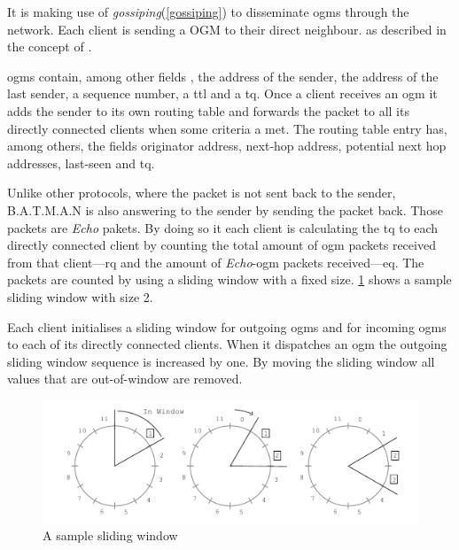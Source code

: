 It is making use of \textit{gossiping}(\ref{gossiping}) to disseminate \glspl{ogm} through the network. Each client is sending a \gls{OGM} to their direct neighbour.  as described in the concept of \citet{batman}.

\Glspl{ogm} contain, among other fields \cite[\S2]{tobias_hardes}, the address of the sender, the address of the last sender, a sequence number, a \gls{ttl} and a \gls{tq}. 
Once a client receives an \gls{ogm} it adds the sender to its own routing table and forwards the packet to all its directly connected clients when some criteria a met. 
The routing table entry has, among others\cite[\S2.1]{tobias_hardes}, the fields originator address, next-hop address, potential next hop addresses, last-seen and \gls{tq}.

Unlike other protocols, where the packet is not sent back to the sender, B.A.T.M.A.N is also answering to the sender by sending the packet back. Those packets are \textit{Echo} pakets. By doing so it each client is calculating the \gls{tq} to each directly connected client by counting the total amount of \gls{ogm} packets received from that client—\gls{rq} and the amount of \textit{Echo}-\gls{ogm} packets received—\gls{eq}. 
The packets are counted by using a sliding window \cite[\S3.4]{tanenbaum_wetherall_2011} with a fixed size. \cref{fig:sliding-window} shows a sample sliding window with size 2. 

Each client initialises a sliding window for outgoing \glspl{ogm} and for incoming \glspl{ogm} to each of its directly connected clients. When it dispatches an \gls{ogm} the outgoing sliding window sequence is increased by one. By moving the sliding window all values that are out-of-window are removed.

\begin{figure}
\centering
\includegraphics[width=1\textwidth]{graphics/sliding-window.pdf}
\caption{A sample sliding window}
\label{fig:sliding-window}
\end{figure}

